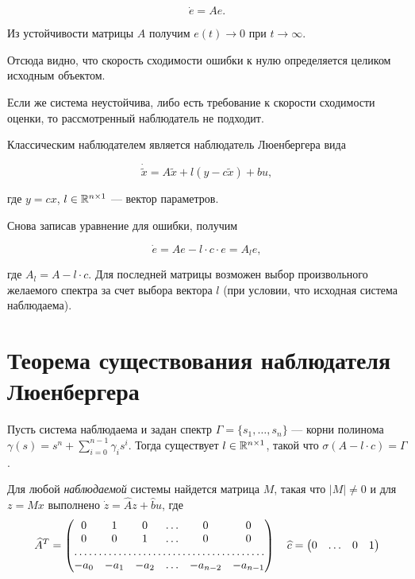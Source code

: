 \documentclass[../../TAU.tex]{subfiles}
\begin{document}
    $$
        \dot e = A e.
    $$
    
    Из устойчивости матрицы $A$ получим $e(t)\rightarrow0$ при $t\rightarrow\infty$.

    Отсюда видно, что скорость сходимости ошибки к нулю определяется целиком исходным объектом.

    Если же система неустойчива, либо есть требование к скорости сходимости оценки, то рассмотренный наблюдатель не подходит.

    Классическим наблюдателем является наблюдатель Люенбергера вида
    
    $$
        \dot{\tilde x} = A\tilde x + l (y-c\tilde x) + b u,
    $$
    
    где $y = cx$, $l\in\mathbb{R}^{n\times 1}$ --- вектор параметров.

    Снова записав уравнение для ошибки, получим
    
    $$
        \dot e = A e - l\cdot c\cdot e = A_l e,
    $$
    
    где $A_l = A-l\cdot c$. Для последней матрицы возможен выбор произвольного желаемого спектра за счет выбора вектора $l$ (при условии, что исходная система наблюдаема).

\section{Теорема существования наблюдателя Люенбергера}

    \begin{theor}
        Пусть система  наблюдаема и задан спектр $\Gamma=\{s_1,\ldots, s_n\}$ --- корни полинома $\gamma(s)=s^n+\sum_{i=0}^{n-1}\gamma_i s^i$.
        Тогда существует $l\in\mathbb{R}^{n\times 1}$, такой что $\sigma(A-l\cdot c) = \Gamma$.
    \end{theor}

    \begin{statement}
        Для любой {\it наблюдаемой} системы  найдется матрица $M$, такая что $|M|\neq0$ и для $z=Mx$ выполнено
        $\dot z = \widehat A z + \widehat b u$,
        где
        $$
        \widehat A^T =
        \begin{pmatrix}
            0& 1& 0& \ldots& 0& 0\\
            0& 0& 1& \ldots& 0& 0\\
            \hdotsfor{6}\\
            -a_0& -a_1& -a_2 &\ldots& -a_{n-2}& -a_{n-1}
        \end{pmatrix}\quad
        \widehat c=
        \begin{pmatrix}
            0 & \ldots & 0 & 1
        \end{pmatrix}
        $$
    \end{statement}
\end{document}
